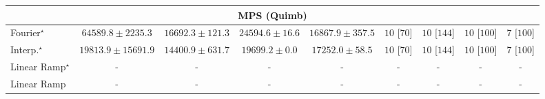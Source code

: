 \begin{tabular}{l|cccc|cccc|}
\cline{1-9}
\multicolumn{9}{c}{\rule{0pt}{8pt}MPS (Quimb)} \\
\midrule
Fourier$^\star$ & {\cellcolor[HTML]{8E3104}} \color[HTML]{F1F1F1} $64589.8\pm 2235.3$ & {\cellcolor[HTML]{FECF67}} \color[HTML]{000000} $16692.3\pm 121.3$ & {\cellcolor[HTML]{FEB340}} \color[HTML]{000000} $24594.6\pm 16.6$ & {\cellcolor[HTML]{FECE65}} \color[HTML]{000000} $16867.9\pm 357.5$ & {\cellcolor[HTML]{49006A}} \color[HTML]{F1F1F1} $10$ [$70$] & {\cellcolor[HTML]{49006A}} \color[HTML]{F1F1F1} $10$ [$144$] & {\cellcolor[HTML]{49006A}} \color[HTML]{F1F1F1} $10$ [$100$] & {\cellcolor[HTML]{CD238F}} \color[HTML]{F1F1F1} $7$ [$100$] \\
Interp.$^\star$ & {\cellcolor[HTML]{FEC652}} \color[HTML]{000000} $19813.9\pm 15691.9$ & {\cellcolor[HTML]{FED676}} \color[HTML]{000000} $14400.9\pm 631.7$ & {\cellcolor[HTML]{FEC754}} \color[HTML]{000000} $19699.2\pm 0.0$ & {\cellcolor[HTML]{FECD63}} \color[HTML]{000000} $17252.0\pm 58.5$ & {\cellcolor[HTML]{49006A}} \color[HTML]{F1F1F1} $10$ [$70$] & {\cellcolor[HTML]{49006A}} \color[HTML]{F1F1F1} $10$ [$144$] & {\cellcolor[HTML]{49006A}} \color[HTML]{F1F1F1} $10$ [$100$] & {\cellcolor[HTML]{CD238F}} \color[HTML]{F1F1F1} $7$ [$100$] \\
Linear Ramp$^\star$ & {\cellcolor[HTML]{000000}} \color[HTML]{F1F1F1} {\cellcolor{white}} \color{black} - & {\cellcolor[HTML]{000000}} \color[HTML]{F1F1F1} {\cellcolor{white}} \color{black} - & {\cellcolor[HTML]{000000}} \color[HTML]{F1F1F1} {\cellcolor{white}} \color{black} - & {\cellcolor[HTML]{000000}} \color[HTML]{F1F1F1} {\cellcolor{white}} \color{black} - & {\cellcolor[HTML]{000000}} \color[HTML]{F1F1F1} {\cellcolor{white}} \color{black} - & {\cellcolor[HTML]{000000}} \color[HTML]{F1F1F1} {\cellcolor{white}} \color{black} - & {\cellcolor[HTML]{000000}} \color[HTML]{F1F1F1} {\cellcolor{white}} \color{black} - & {\cellcolor[HTML]{000000}} \color[HTML]{F1F1F1} {\cellcolor{white}} \color{black} - \\
Linear Ramp & {\cellcolor[HTML]{000000}} \color[HTML]{F1F1F1} {\cellcolor{white}} \color{black} - & {\cellcolor[HTML]{000000}} \color[HTML]{F1F1F1} {\cellcolor{white}} \color{black} - & {\cellcolor[HTML]{000000}} \color[HTML]{F1F1F1} {\cellcolor{white}} \color{black} - & {\cellcolor[HTML]{000000}} \color[HTML]{F1F1F1} {\cellcolor{white}} \color{black} - & {\cellcolor[HTML]{000000}} \color[HTML]{F1F1F1} {\cellcolor{white}} \color{black} - & {\cellcolor[HTML]{000000}} \color[HTML]{F1F1F1} {\cellcolor{white}} \color{black} - & {\cellcolor[HTML]{000000}} \color[HTML]{F1F1F1} {\cellcolor{white}} \color{black} - & {\cellcolor[HTML]{000000}} \color[HTML]{F1F1F1} {\cellcolor{white}} \color{black} - \\

\end{tabular}
